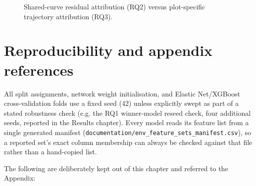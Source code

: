 \begin{figure}[!htbp]
\centering
{}
\caption{Shared-curve residual attribution (RQ2) versus plot-specific trajectory attribution
(RQ3).}
\label{fig:attribution-comparison}
\end{figure}

\section{Reproducibility and appendix references}
\label{sec:reproducibility}

All split assignments, network weight initialisation, and Elastic Net/XGBoost cross-validation
folds use a fixed seed (42) unless explicitly swept as part of a stated robustness check (e.g. the
RQ1 winner-model reseed check, four additional seeds, reported in the Results chapter). Every
model reads its feature list from a single generated manifest
(\texttt{documentation/env\_feature\_sets\_manifest.csv}), so a reported set's exact column
membership can always be checked against that file rather than a hand-copied list.

The following are deliberately kept out of this chapter and referred to the Appendix:


